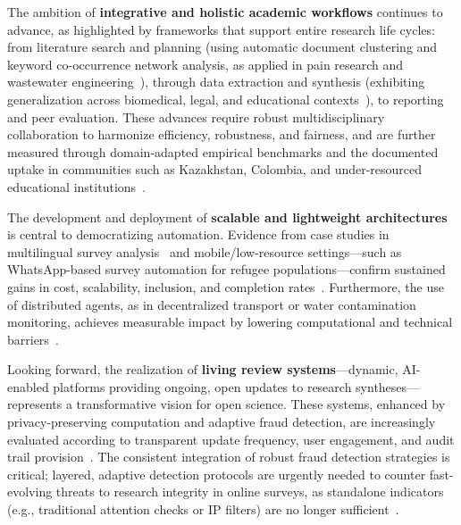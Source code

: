 \documentclass[sigconf]{acmart}
\begin{document}
The ambition of \textbf{integrative and holistic academic workflows} continues to advance, as highlighted by frameworks that support entire research life cycles: from literature search and planning (using automatic document clustering and keyword co-occurrence network analysis, as applied in pain research and wastewater engineering~\cite{ref81,ref82}), through data extraction and synthesis (exhibiting generalization across biomedical, legal, and educational contexts~\cite{ref104,ref110}), to reporting and peer evaluation. These advances require robust multidisciplinary collaboration to harmonize efficiency, robustness, and fairness, and are further measured through domain-adapted empirical benchmarks and the documented uptake in communities such as Kazakhstan, Colombia, and under-resourced educational institutions~\cite{ref104,ref108,ref109,ref110,ref117}.

The development and deployment of \textbf{scalable and lightweight architectures} is central to democratizing automation. Evidence from case studies in multilingual survey analysis~\cite{ref93,ref104,ref105,ref109} and mobile/low-resource settings—such as WhatsApp-based survey automation for refugee populations—confirm sustained gains in cost, scalability, inclusion, and completion rates~\cite{ref117}. Furthermore, the use of distributed agents, as in decentralized transport or water contamination monitoring, achieves measurable impact by lowering computational and technical barriers~\cite{ref112,ref114,ref115}.

Looking forward, the realization of \textbf{living review systems}—dynamic, AI-enabled platforms providing ongoing, open updates to research syntheses—represents a transformative vision for open science. These systems, enhanced by privacy-preserving computation and adaptive fraud detection, are increasingly evaluated according to transparent update frequency, user engagement, and audit trail provision~\cite{ref78,ref84,ref97,ref103,ref104,ref105,ref108,ref110,ref112,ref113,ref114,ref115,ref117}. The consistent integration of robust fraud detection strategies is critical; layered, adaptive detection protocols are urgently needed to counter fast-evolving threats to research integrity in online surveys, as standalone indicators (e.g., traditional attention checks or IP filters) are no longer sufficient~\cite{ref95,ref100}.
\end{document}
